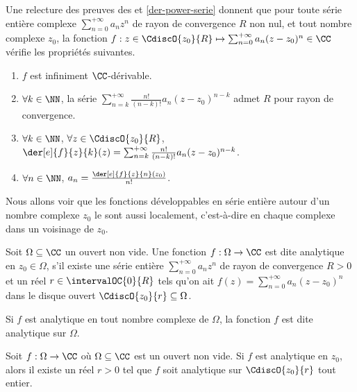 \begin{remark} \label{der-power-serie-gene}
	Une relecture des preuves des  et \ref{der-power-serie} donnent que pour toute série entière complexe $\sum_{n=0}^{+\infty} a_n z^n$ de rayon de convergence $R$ non nul,
	et tout nombre complexe $z_0$,
	la fonction $f: z \in \CdiscO{z_0}{R} \mapsto \sum_{n=0}^{+\infty} a_n (z - z_0)^n \in \CC$ vérifie les propriétés suivantes.
    \begin{enumerate}
    	\item $f$ est infiniment $\CC$-dérivable.

    	\item $\forall k \in \NN$,
		la série $\sum_{n = k}^{+\infty} \frac{n!}{(n-k)!} a_n (z - z_0)^{n - k}$ admet $R$ pour rayon de convergence.

    	\item $\forall k \in \NN$, $\forall z \in \CdiscO{z_0}{R}$,
		$\der[e]{f}{z}{k}(z) = \sum_{n = k}^{+\infty} \frac{n!}{(n-k)!} a_n (z - z_0)^{n - k}$.

    	\item $\forall n \in \NN$, $a_n = \frac{\der[e]{f}{z}{n}(z_0)}{n!}$.
    \end{enumerate}
\end{remark}




Nous allons voir que les fonctions développables en série entière autour d'un nombre complexe $z_0$ le sont aussi localement, c'est-à-dire en chaque complexe dans un voisinage de $z_0$.


\begin{defi} \label{def-analytic}
    Soit $\Omega \subseteq \CC$ un ouvert non vide.
	Une fonction $f: \Omega \rightarrow \CC$ est dite analytique en $z_0 \in \Omega$, 
	s'il existe
	une série entière $\sum_{n = 0}^{+\infty} a_n z^n$
	de rayon de convergence $R > 0$
	et
	un réel $r \in \intervalOC{0}{R}$ tels qu'on ait
	$f(z) = \sum_{n = 0}^{+\infty} a_n (z - z_0)^n$
	dans le disque ouvert $\CdiscO{z_0}{r} \subseteq \Omega$.

	\smallskip
	
	Si $f$ est analytique en tout nombre complexe de $\Omega$,
	la fonction $f$ est dite analytique sur $\Omega$.
\end{defi}




\begin{fact} \label{power-serie-vs-analytic}
    Soit $f: \Omega \rightarrow \CC$ où $\Omega \subseteq \CC$ est un ouvert non vide.
    Si $f$ est analytique en $z_0$,
	alors
	il existe un réel $r > 0$ tel que $f$ soit analytique sur $\CdiscO{z_0}{r}$ tout entier. 
\end{fact}


